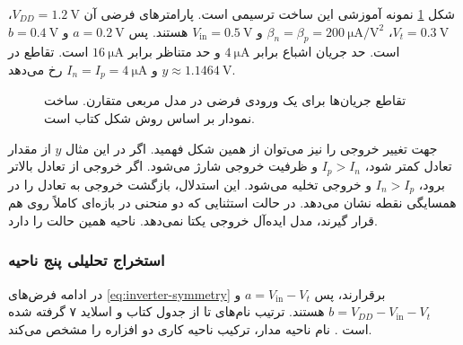 شکل \ref{fig:inverter-current-intersection} نمونه آموزشی این ساخت
ترسیمی است. پارامترهای فرضی آن
\(V_{DD}=\qty{1.2}{\volt}\)، \(V_t=\qty{0.3}{\volt}\)،
\(\beta_n=\beta_p=\qty{200}{\micro\ampere\per\volt\squared}\)
و \(V_{\mathrm{in}}=\qty{0.5}{\volt}\) هستند.
پس \(a=\qty{0.2}{\volt}\) و \(b=\qty{0.4}{\volt}\) است.
حد جریان اشباع  برابر \(\qty{4}{\micro\ampere}\) و حد
متناظر  برابر \(\qty{16}{\micro\ampere}\) است.
تقاطع در \(y\approx\qty{1.1464}{\volt}\) و
\(I_n=I_p=\qty{4}{\micro\ampere}\) رخ می‌دهد.
\begin{figure}[!htbp]
\centering
\begin{latin}
\PersianMathDigits
{}
\end{latin}
\caption{تقاطع جریان‌ها برای یک ورودی فرضی در مدل مربعی متقارن.
ساخت نمودار بر اساس روش شکل  کتاب است.}
\label{fig:inverter-current-intersection}
\end{figure}

جهت تغییر خروجی را نیز می‌توان از همین شکل فهمید. اگر در این
مثال \(y\) از مقدار تعادل کمتر شود، \(I_p>I_n\) و ظرفیت خروجی
شارژ می‌شود. اگر خروجی از تعادل بالاتر برود، \(I_n>I_p\) و خروجی
تخلیه می‌شود. این استدلال، بازگشت خروجی به تعادل را در همسایگی
نقطه نشان می‌دهد. در حالت استثنایی که دو منحنی در بازه‌ای کاملاً
روی هم قرار گیرند، مدل ایده‌آل خروجی یکتا نمی‌دهد. ناحیه 
همین حالت را دارد.

\subsubsection{استخراج تحلیلی پنج ناحیه}
\label{sec:inverter-five-regions}
در ادامه فرض‌های \eqref{eq:inverter-symmetry} برقرارند، پس
\(a=V_{\mathrm{in}}-V_t\) و
\(b=V_{DD}-V_{\mathrm{in}}-V_t\) هستند. ترتیب نام‌های
 تا  از جدول  کتاب و اسلاید ۷ گرفته
شده است \cite{weste,dcslides}. نام ناحیه مدار، ترکیب ناحیه کاری
دو افزاره را مشخص می‌کند.


